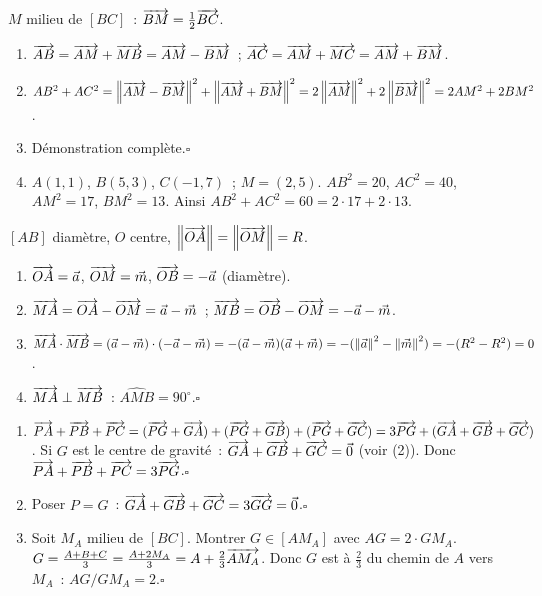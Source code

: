 
$M$ milieu de $[BC]$~: $\overrightarrow{BM}=\frac{1}{2}\overrightarrow{BC}$.
\begin{enumerate}
  \item $\overrightarrow{AB}=\overrightarrow{AM}+\overrightarrow{MB}=\overrightarrow{AM}-\overrightarrow{BM}$~;
        $\overrightarrow{AC}=\overrightarrow{AM}+\overrightarrow{MC}=\overrightarrow{AM}+\overrightarrow{BM}$.
  \item $AB^2+AC^2=\left\|\overrightarrow{AM}-\overrightarrow{BM}\right\|^2+\left\|\overrightarrow{AM}+\overrightarrow{BM}\right\|^2
        =2\left\|\overrightarrow{AM}\right\|^2+2\left\|\overrightarrow{BM}\right\|^2=2AM^2+2BM^2$.
  \item D\'emonstration compl\`ete.\hfill$\square$
  \item $A(1,1)$, $B(5,3)$, $C(-1,7)$~; $M=(2,5)$.
        $AB^2=20$, $AC^2=40$, $AM^2=17$, $BM^2=13$.
        Ainsi $AB^2+AC^2=60=2\cdot17+2\cdot13$.\checkmark
\end{enumerate}


$[AB]$ diam\`etre, $O$ centre, $\left\|\overrightarrow{OA}\right\|=\left\|\overrightarrow{OM}\right\|=R$.
\begin{enumerate}
  \item $\overrightarrow{OA}=\vec{a}$, $\overrightarrow{OM}=\vec{m}$, $\overrightarrow{OB}=-\vec{a}$ (diam\`etre).
  \item $\overrightarrow{MA}=\overrightarrow{OA}-\overrightarrow{OM}=\vec{a}-\vec{m}$~;
        $\overrightarrow{MB}=\overrightarrow{OB}-\overrightarrow{OM}=-\vec{a}-\vec{m}$.
  \item $\overrightarrow{MA}\cdot\overrightarrow{MB}=(\vec{a}-\vec{m})\cdot(-\vec{a}-\vec{m})
        =-(\vec{a}-\vec{m})(\vec{a}+\vec{m})
        =-(\left\|\vec{a}\right\|^2-\left\|\vec{m}\right\|^2)=-(R^2-R^2)=0$.
  \item $\overrightarrow{MA}\perp\overrightarrow{MB}$~: $\widehat{AMB}=90^{\circ}$.\hfill$\square$
\end{enumerate}


\begin{enumerate}
  \item $\overrightarrow{PA}+\overrightarrow{PB}+\overrightarrow{PC}
        =(\overrightarrow{PG}+\overrightarrow{GA})+(\overrightarrow{PG}+\overrightarrow{GB})+(\overrightarrow{PG}+\overrightarrow{GC})
        =3\overrightarrow{PG}+(\overrightarrow{GA}+\overrightarrow{GB}+\overrightarrow{GC})$.
        Si $G$ est le centre de gravité~: $\overrightarrow{GA}+\overrightarrow{GB}+\overrightarrow{GC}=\vec{0}$ (voir (2)).
        Donc $\overrightarrow{PA}+\overrightarrow{PB}+\overrightarrow{PC}=3\overrightarrow{PG}$.\hfill$\square$
  \item Poser $P=G$~: $\overrightarrow{GA}+\overrightarrow{GB}+\overrightarrow{GC}=3\overrightarrow{GG}=\vec{0}$.\hfill$\square$
  \item Soit $M_A$ milieu de $[BC]$. Montrer $G\in[AM_A]$ avec $AG=2\cdot GM_A$.
        $G=\frac{A+B+C}{3}=\frac{A+2M_A}{3}=A+\frac{2}{3}\overrightarrow{AM_A}$.
        Donc $G$ est \`a $\frac{2}{3}$ du chemin de $A$ vers $M_A$~:
        $AG/GM_A=2$.\hfill$\square$
\end{enumerate}

